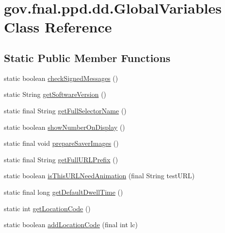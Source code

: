 \hypertarget{classgov_1_1fnal_1_1ppd_1_1dd_1_1GlobalVariables}{\section{gov.\-fnal.\-ppd.\-dd.\-Global\-Variables Class Reference}
\label{classgov_1_1fnal_1_1ppd_1_1dd_1_1GlobalVariables}
}
\subsection*{Static Public Member Functions}
\begin{DoxyCompactItemize}
\item 
static boolean \hyperlink{classgov_1_1fnal_1_1ppd_1_1dd_1_1GlobalVariables_a8476c0f09c9b451243871c5d810a637e}{check\-Signed\-Messages} ()
\item 
static String \hyperlink{classgov_1_1fnal_1_1ppd_1_1dd_1_1GlobalVariables_a7ad73efb183068d334b1977c3ef799cc}{get\-Software\-Version} ()
\item 
static final String \hyperlink{classgov_1_1fnal_1_1ppd_1_1dd_1_1GlobalVariables_ae88e0336fe6e23f56d14aee1882b88d4}{get\-Full\-Selector\-Name} ()
\item 
static boolean \hyperlink{classgov_1_1fnal_1_1ppd_1_1dd_1_1GlobalVariables_a76a3e484172e77490916e0a8a7100d8b}{show\-Number\-On\-Display} ()
\item 
static final void \hyperlink{classgov_1_1fnal_1_1ppd_1_1dd_1_1GlobalVariables_ad98b765500d19827fff9a6aa78b8b9a4}{prepare\-Saver\-Images} ()
\item 
static final String \hyperlink{classgov_1_1fnal_1_1ppd_1_1dd_1_1GlobalVariables_ab7639ebfcc296b374593079a06026c65}{get\-Full\-U\-R\-L\-Prefix} ()
\item 
static boolean \hyperlink{classgov_1_1fnal_1_1ppd_1_1dd_1_1GlobalVariables_a635743039cfe736aa5a0758711c96dd1}{is\-This\-U\-R\-L\-Need\-Animation} (final String test\-U\-R\-L)
\item 
static final long \hyperlink{classgov_1_1fnal_1_1ppd_1_1dd_1_1GlobalVariables_aedef0ba63ced272b0ec2f17504a2cf96}{get\-Default\-Dwell\-Time} ()
\item 
static int \hyperlink{classgov_1_1fnal_1_1ppd_1_1dd_1_1GlobalVariables_a9628de1e1de48d98cda0cc110f0c1b92}{get\-Location\-Code} ()
\item 
static boolean \hyperlink{classgov_1_1fnal_1_1ppd_1_1dd_1_1GlobalVariables_a17d26da1f2cffe32553babb71545319e}{add\-Location\-Code} (final int lc)

\end{DoxyCompactItemize}
